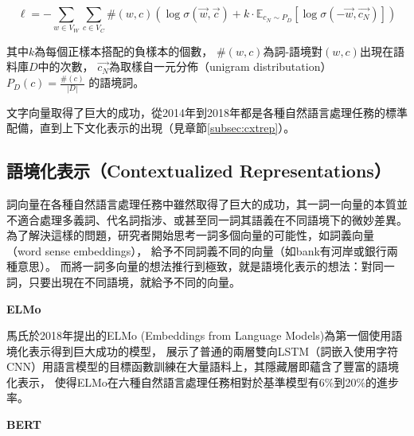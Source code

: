 \begin{equation}
    \ell = - \sum\limits_{w \in V_{W}} \sum\limits_{c \in V_{C}} \#(w, c) \left( \log \sigma (\vec{w}, \vec{c}) + k \cdot \mathbb{E}_{c_{N} \sim P_{D}} [\log \sigma \left( - \vec{w}, \vec{c_{N}} \right)] \right)
\end{equation}

其中$k$為每個正樣本搭配的負樣本的個數，
$\#(w, c)$為詞-語境對$(w, c)$出現在語料庫$D$中的次數，
$\vec{c_{N}}$為取樣自一元分佈（unigram distributation） $P_{D} (c) = \frac{\#(c)}{|D|}$ 的語境詞。

文字向量取得了巨大的成功，從2014年到2018年都是各種自然語言處理任務的標準配備，直到上下文化表示的出現（見章節\ref{subsec:cxtrep}）。

\iffalse
\vspace{12pt}
\noindent\textbf{全局向量詞表示（GloVe）}
\vspace{4pt}
GloVe使用矩陣分解（matrix factorization）將碩大無朋的共現矩陣$M$分解為兩個子矩陣$W$與$C$，根據其設計的損失函數：
\fi

\subsection{語境化表示（Contextualized Representations）}
詞向量在各種自然語言處理任務中雖然取得了巨大的成功，其一詞一向量的本質並不適合處理多義詞、代名詞指涉、或甚至同一詞其語義在不同語境下的微妙差異。
為了解決這樣的問題，研究者開始思考一詞多個向量的可能性，如詞義向量（word sense embeddings），
給予不同詞義不同的向量（如bank有河岸或銀行兩種意思）\cite{reisinger-mooney-2010-multi,neelakantan-etal-2014-efficient}。
而將一詞多向量的想法推行到極致，就是語境化表示的想法：對同一詞，只要出現在不同語境，就給予不同的向量。

\vspace{12pt}
\noindent\textbf{ELMo}
\vspace{4pt}

馬氏\cite{peters-etal-2018-deep}於2018年提出的ELMo (Embeddings from Language Models)為第一個使用語境化表示得到巨大成功的模型，
展示了普通的兩層雙向LSTM（詞嵌入使用字符CNN）用語言模型的目標函數訓練在大量語料上，其隱藏層即蘊含了豐富的語境化表示，
使得ELMo在六種自然語言處理任務相對於基準模型有6\%到20\%的進步率。


\vspace{12pt}
\noindent\textbf{BERT}
\vspace{4pt}

